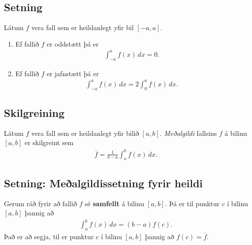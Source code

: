 \documentclass[a4paper,10pt,icelandic]{sphinxmanual}
\begin{document}
\subsection{Setning}
\label{kafli06:id6}
Látum \(f\) vera fall sem er heildanlegt yfir bil \([-a, a]\).
\begin{enumerate}
\item {} 
Ef fallið \(f\) er oddstætt þá er
\begin{equation*}
\begin{split}\int_{-a}^a f(x)\,dx=0.\end{split}
\end{equation*}
\item {} 
Ef fallið \(f\) er jafnstætt þá er
\begin{equation*}
\begin{split}\int_{-a}^a f(x)\,dx=2\int_0^a f(x)\,dx.\end{split}
\end{equation*}
\end{enumerate}


\subsection{Skilgreining}
\label{kafli06:id7}\label{kafli06:index-3}
Látum \(f\) vera fall sem er heildanlegt yfir bilið \([a, b]\).
\textit{Meðalgildi} fallsins \(f\) á bilinu \([a, b]\) er skilgreint
sem
\begin{equation*}
\begin{split}\bar{f}=\frac{1}{b-a}\int_{a}^b f(x)\,dx.\end{split}
\end{equation*}

\subsection{Setning: Meðalgildissetning fyrir heildi}
\label{kafli06:setning-mealgildissetning-fyrir-heildi}\label{kafli06:index-4}
Gerum ráð fyrir að fallið \(f\) sé \textbf{samfellt} á bilinu
\([a, b]\). Þá er til punktur \(c\) í bilinu \([a, b]\)
þannig að
\begin{equation*}
\begin{split}\int_a^b f(x)\,dx=(b-a)f(c).\end{split}
\end{equation*}
Það er að segja, til er punktur \(c\) í bilinu \([a, b]\) þannig
að \(f(c)=\bar{f}\).
\end{document}
